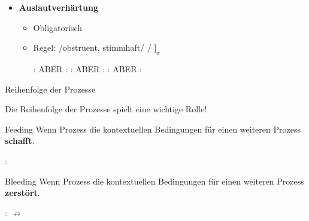 \begin{frame}

\begin{itemize}
	\item \textbf{Auslautverhärtung}

	\begin{itemize}
		\item Obligatorisch
		\item Regel: /obstruent, stimmhaft/  / \underline{\quad} $]_\sigma$

	\eal
		\ex {}:  \ras \textipa{[ba:t]}
		\ex ABER :  \ras \textipa{[bE:.d5]}
		\ex {}:  \ras \textipa{[Po.li:f]}
		\ex ABER :  \ras \textipa{[Po.li:.v@]}
		\ex {}:  \ras {}
		\ex ABER :  \ras \textipa{[PEn.d@]}
	\zl
	
	\end{itemize}

\end{itemize}

\end{frame}



%
%

\begin{frame}{Reihenfolge der Prozesse}

Die Reihenfolge der Prozesse spielt eine wichtige Rolle!

	\begin{block}{Feeding}
	Wenn Prozess die kontextuellen Bedingungen für einen weiteren Prozess \textbf{schafft}.	

	\end{block}

	\ea {}:  \ras \textipa{[ha:k\textsyllabic{n}]} \ras \textipa{[ha:k\textsyllabic{N}]}
	\z

	\begin{block}{Bleeding}
	Wenn Prozess die kontextuellen Bedingungen für einen weiteren Prozess \textbf{zerstört}.
	\end{block}

	\ea {}:  \ras \textipa{[g@.zaNg]} \ras \textipa{[g@.zaN]} $\nrightarrow$ \textipa{[g@.zaNk]}
	\z
	

\end{frame}




